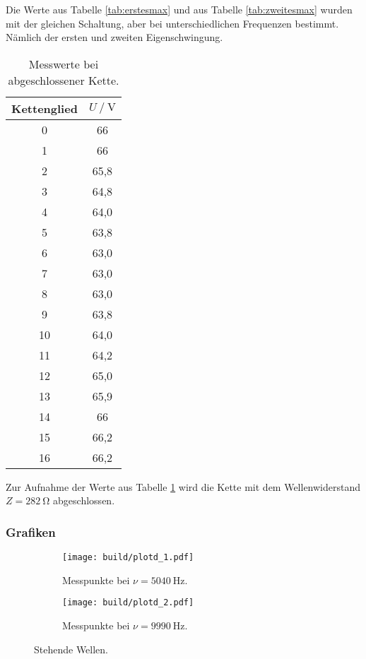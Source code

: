 Die Werte aus Tabelle \ref{tab:erstesmax} und aus Tabelle \ref{tab:zweitesmax}
wurden mit der gleichen Schaltung, aber bei unterschiedlichen Frequenzen bestimmt.
Nämlich der ersten und zweiten Eigenschwingung.


\begin{table}[h]
  \centering
  \caption{Messwerte bei abgeschlossener Kette.}
  \label{tab:absw=wellw}
  \begin{tabular}{c c}
    \toprule
     Kettenglied & $U \:/\: \si{\volt}$\\
    \midrule
    0 & 66\\
    1 & 66\\
    2 & 65,8\\
    3 & 64,8\\
    4 & 64,0\\
    5 & 63,8\\
    6 & 63,0\\
    7 & 63,0\\
    8 & 63,0\\
    9 & 63,8\\
    10 & 64,0\\
    11 & 64,2\\
    12 & 65,0\\
    13 & 65,9\\
    14 & 66\\
    15 & 66,2\\
    16 & 66,2\\
    \bottomrule
  \end{tabular}
\end{table}

Zur Aufnahme der Werte aus Tabelle \ref{tab:absw=wellw} wird die Kette mit dem
Wellenwiderstand $Z = \SI{282}{\ohm}$ abgeschlossen.

\subsubsection{Grafiken}

\begin{figure}[h]
  \centering
  \begin{subfigure}{0.48\textwidth}
    \centering
    \texttt{[image: build/plotd\_1.pdf]}
    \caption{Messpunkte bei $\nu = \SI{5040}{\hertz}$.}
    \label{fig:erstesmax}
  \end{subfigure}
  \begin{subfigure}{0.48\textwidth}
    \centering
    \texttt{[image: build/plotd\_2.pdf]}
    \caption{Messpunkte bei $\nu = \SI{9990}{\hertz}$.}
    \label{fig:zweitesmax}
  \end{subfigure}
  \caption{Stehende Wellen.}
  \label{fig:stwell}
\end{figure}

